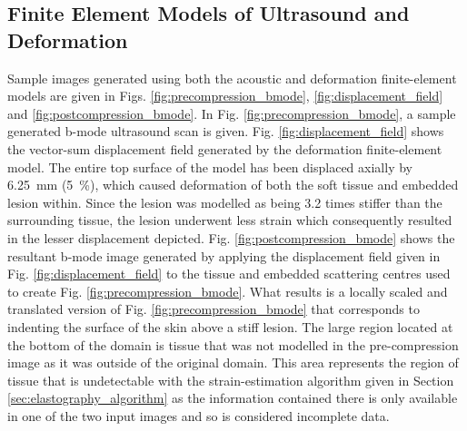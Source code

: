 		\subsection{Finite Element Models of Ultrasound and Deformation}
			\label{sec:femresults}
			Sample images generated using both the acoustic and deformation finite-element models are given in Figs. \ref{fig:precompression_bmode}, \ref{fig:displacement_field} and \ref{fig:postcompression_bmode}. In Fig. \ref{fig:precompression_bmode}, a sample generated b-mode ultrasound scan is given. Fig. \ref{fig:displacement_field} shows the vector-sum displacement field generated by the deformation finite-element model. The entire top surface of the model has been displaced axially by \SI{6.25}{mm} (\SI{5}{\percent}), which caused deformation of both the soft tissue and embedded lesion within. Since the lesion was modelled as being 3.2 times stiffer than the surrounding tissue, the lesion underwent less strain which consequently resulted in the lesser displacement depicted. Fig. \ref{fig:postcompression_bmode} shows the resultant b-mode image generated by applying the displacement field given in Fig. \ref{fig:displacement_field} to the tissue and embedded scattering centres used to create Fig. \ref{fig:precompression_bmode}. What results is a locally scaled and translated version of Fig. \ref{fig:precompression_bmode} that corresponds to indenting the surface of the skin above a stiff lesion. The large  region located at the bottom of the domain is tissue that was not modelled in the pre-compression image as it was outside of the original domain. This area represents the region of tissue that is undetectable with the strain-estimation algorithm given in Section \ref{sec:elastography_algorithm} as the information contained there is only available in one of the two input images and so is considered incomplete data.


